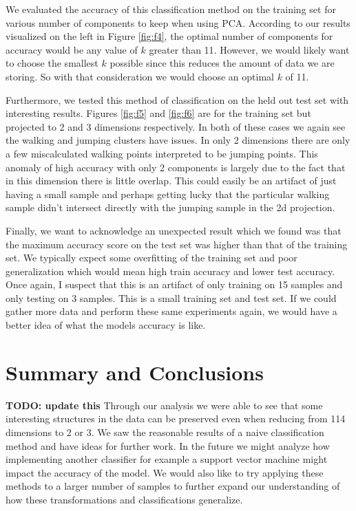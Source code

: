 \documentclass[11pt]{amsart}
\begin{document}
We evaluated the accuracy of this classification method on the training set for various number of components to keep when using PCA.
According to our results visualized on the left in Figure \ref{fig:f4}, the optimal number of components for accuracy would be any value of $k$ greater than 11.
However, we would likely want to choose the smallest $k$ possible since this reduces the amount of data we are storing.
So with that consideration we would choose an optimal $k$ of 11.

Furthermore, we tested this method of classification on the held out test set with interesting results.
Figures \ref{fig:f5} and \ref{fig:f6} are for the training set but projected to 2 and 3 dimensions respectively.
In both of these cases we again see the walking and jumping clusters have issues.
In only 2 dimensions there are only a few miscalculated walking points interpreted to be jumping points.
This anomaly of high accuracy with only 2 components is largely due to the fact that in this dimension there is little overlap.
This could easily be an artifact of just having a small sample and perhaps getting lucky that the particular walking sample didn't intersect directly with the jumping sample in the 2d projection.

Finally, we want to acknowledge an unexpected result which we found was that the maximum accuracy score on the test set was higher than that of the training set.
We typically expect some overfitting of the training set and poor generalization which would mean high train accuracy and lower test accuracy.
Once again, I suspect that this is an artifact of only training on 15 samples and only testing on 3 samples.
This is a small training set and test set.
If we could gather more data and perform these same experiments again, we would have a better idea of what the models accuracy is like.

\section{Summary and Conclusions}\label{sec:conclusions} \textbf{TODO: update this}
Through our analysis we were able to see that some interesting structures in the data can be preserved even when reducing from 114 dimensions to 2 or 3.
We saw the reasonable results of a naive classification method and have ideas for further work.
In the future we might analyze how implementing another classifier for example a support vector machine might impact the accuracy of the model.
We would also like to try applying these methods to a larger number of samples to further expand our understanding of how these transformations and classifications generalize.
\end{document}
